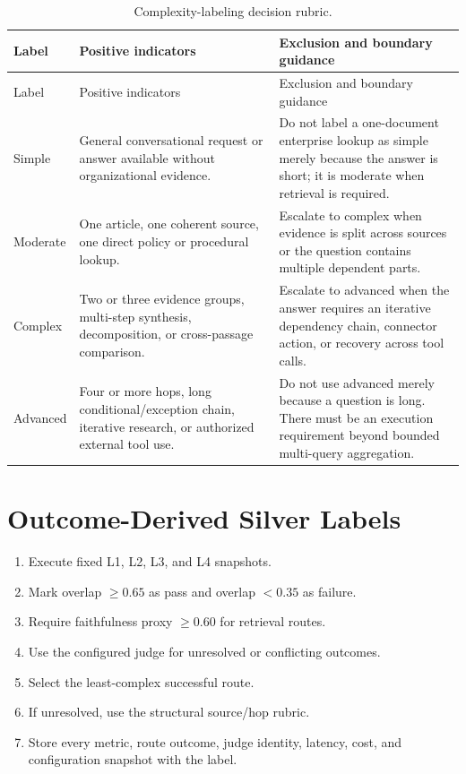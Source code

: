 \begin{longtable}{p{}p{}p{}}
  \caption{Complexity-labeling decision rubric.}
  \label{tab:appendix-label-rubric}\\
  \toprule
  Label & Positive indicators & Exclusion and boundary guidance\\
  \midrule
  \endfirsthead
  \toprule
  Label & Positive indicators & Exclusion and boundary guidance\\
  \midrule
  \endhead
  Simple &
  General conversational request or answer available without organizational
  evidence. &
  Do not label a one-document enterprise lookup as simple merely because the
  answer is short; it is moderate when retrieval is required.\\
  Moderate &
  One article, one coherent source, one direct policy or procedural lookup. &
  Escalate to complex when evidence is split across sources or the question
  contains multiple dependent parts.\\
  Complex &
  Two or three evidence groups, multi-step synthesis, decomposition, or
  cross-passage comparison. &
  Escalate to advanced when the answer requires an iterative dependency chain,
  connector action, or recovery across tool calls.\\
  Advanced &
  Four or more hops, long conditional/exception chain, iterative research, or
  authorized external tool use. &
  Do not use advanced merely because a question is long. There must be an
  execution requirement beyond bounded multi-query aggregation.\\
  \bottomrule
\end{longtable}

\section{Outcome-Derived Silver Labels}

\begin{enumerate}
  \item Execute fixed L1, L2, L3, and L4 snapshots.
  \item Mark overlap $\geq 0.65$ as pass and overlap $<0.35$ as failure.
  \item Require faithfulness proxy $\geq 0.60$ for retrieval routes.
  \item Use the configured judge for unresolved or conflicting outcomes.
  \item Select the least-complex successful route.
  \item If unresolved, use the structural source/hop rubric.
  \item Store every metric, route outcome, judge identity, latency, cost, and
  configuration snapshot with the label.
\end{enumerate}

